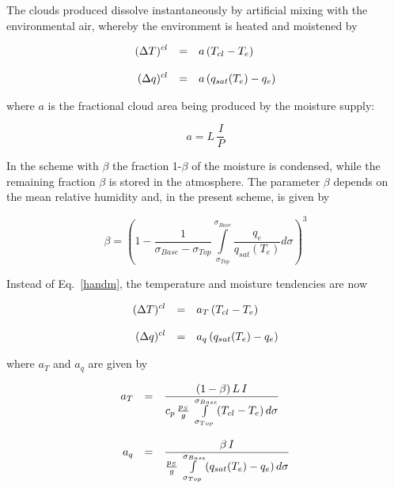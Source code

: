 The clouds produced dissolve instantaneously by
artificial mixing with the environmental air,
whereby the environment is heated and moistened by

\begin{equation}\label{handm}
\begin{array}{rcl}
\displaystyle (\Delta T)^{cl} & = & \displaystyle a \, (T_{cl} -T _e) \\
&&\\
\displaystyle (\Delta q)^{cl} & = & \displaystyle a \, (q_{sat}(T_e) -q _e) 
\end{array}
\end{equation}

where $a$ is the fractional cloud area being produced
by the moisture supply:

\begin{equation}
a=L\, \frac{I}{P}
\end{equation}


In the scheme with $\beta$ the fraction 1-$\beta$ of the
moisture is condensed, while the
remaining fraction  $\beta$ is stored in the atmosphere.
The  parameter $\beta$ depends on the
mean relative humidity and, in the present scheme, is
given by   

\begin{equation}
\beta = \left( 1 -
\frac{1}{\sigma_{Base}-\sigma_{Top}}
\int\limits_{\sigma_{Top}}^{\sigma_{Base}}
\frac{q_e}{q_{sat}(T_e)} d\sigma \right)^3
\end{equation}

Instead of Eq.~\ref{handm}, the temperature and
moisture tendencies are now

\begin{equation}\label{handm2}
\begin{array}{rcl}
\displaystyle (\Delta T)^{cl} & = & \displaystyle a_T \, (T_{cl} -T _e) \\
&&\\
\displaystyle (\Delta q)^{cl} & = & \displaystyle a_q \, (q_{sat}(T_e) -q
_e) 
\end{array}
\end{equation}

where $a_T$ and $a_q$ are given by  

\begin{equation}
\begin{array}{rcl}
\displaystyle a_T & = & \displaystyle \frac{(1-\beta )\, L\,  I }{c_p\,
\frac{p_S}{g}\,
\int\limits_{\sigma_{Top}}^{\sigma_{Base}} (T_{cl}
- T_e)\, d\sigma} \\
&&\\
\displaystyle a_q & = & \displaystyle \frac{\beta \, I }{\frac{p_S}{g}\,
\int\limits_{\sigma_{Top}}^{\sigma_{Base}}
(q_{sat}(T_e) - q_e) \, d\sigma} 
\end{array}
\end{equation}

